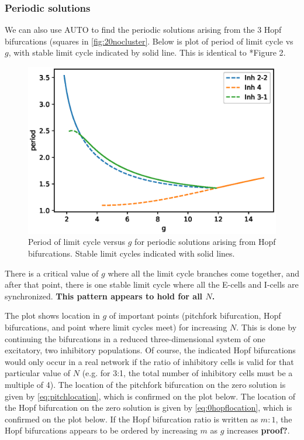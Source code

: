 \documentclass[11pt,reqno]{amsart}
\begin{document}
\subsubsection{Periodic solutions}
We can also use AUTO to find the periodic solutions arising from the 3 Hopf bifurcations (squares in \cref{fig:20nocluster}. Below is plot of period of limit cycle vs $g$, with stable limit cycle indicated by solid line. This is identical to \cite{Barreiro2017}*{Figure 2}.

\begin{figure}[H]
    \centering
    \includegraphics[width=14cm]{images/periodvsg}
    \caption{Period of limit cycle versus $g$ for periodic solutions arising from Hopf bifurcations. Stable limit cycles indicated with solid lines.}
    \label{fig:periodvsg}
\end{figure}

There is a critical value of $g$ where all the limit cycle branches come together, and after that point, there is one stable limit cycle where all the E-cells and I-cells are synchronized.
\textbf{This pattern appears to hold for all $N$.}

The plot shows location in $g$ of important points (pitchfork bifurcation, Hopf bifurcations, and point where limit cycles meet) for increasing $N$. This is done by continuing the bifurcations in a reduced three-dimensional system of one excitatory, two inhibitory populations.  
Of course, the indicated Hopf bifurcations would only occur in a real network if the ratio of inhibitory cells is valid for that particular value of $N$ (e.g. for 3:1, the total number of inhibitory cells must be a multiple of 4). The location of the pitchfork bifurcation on the zero solution is given by \cref{eq:pitchlocation}, which is confirmed on the plot below. The location of the Hopf bifurcation on the zero solution is given by \cref{eq:0hopflocation}, which is confirmed on the plot below. If the Hopf bifurcation ratio is written as $m:1$, the Hopf bifurcations appears to be ordered by increasing $m$ as $g$ increases \textbf{proof?}.
\end{document}
